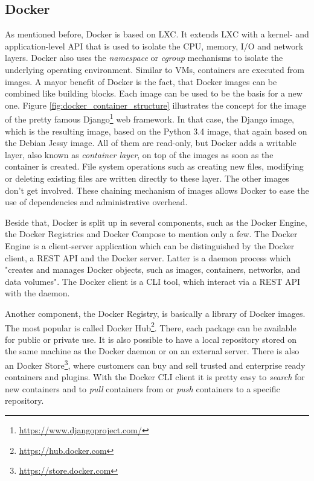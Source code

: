 \subsection{Docker}
As mentioned before, Docker is based on \ac{LXC}.
It extends \ac{LXC} with a kernel- and application-level API that is used to isolate the CPU, memory, I/O and network layers.\autocite[cf.][p. 82]{Bernstein:2014}
Docker also uses the \textit{namespace} or \textit{cgroup} mechanisms to isolate the underlying operating environment.\autocite[cf.][p. 82]{Bernstein:2014}
Similar to \acp{VM}, containers are executed from images.
A mayor benefit of Docker is the fact, that Docker images can be combined like building blocks.
Each image can be used to be the basis for a new one.
Figure \ref{fig:docker_container_structure} illustrates the concept for the image of the pretty famous Django\footnote{\url{https://www.djangoproject.com/}} web framework.
In that case, the Django image, which is the resulting image, based on the Python 3.4 image, that again based on the Debian Jessy image.
All of them are read-only, but Docker adds a writable layer, also known as \textit{container layer}, on top of the images as soon as the container is created.
File system operations such as creating new files, modifying or deleting existing files are written directly to these layer.\autocite[cf.]{dockerImages}
The other images don't get involved.
These chaining mechanism of images allows Docker to ease the use of dependencies and administrative overhead.

Beside that, Docker is split up in several components, such as the Docker Engine, the Docker Registries and Docker Compose to mention only a few.
The Docker Engine is a client-server application which can be distinguished by the Docker client, a \ac{REST} \ac{API} and the Docker server.
Latter is a daemon process which "creates and manages Docker objects, such as images, containers, networks, and data volumes"\autocite{dockerEngine}.
The Docker client is a \ac{CLI} tool, which interact via a \ac{REST} \ac{API} with the daemon.\autocite[cf.]{dockerEngine}

Another component, the Docker Registry, is basically a library of Docker images.
The most popular is called Docker Hub\footnote{\url{https://hub.docker.com}}.
There, each package can be available for public or private use.
It is also possible to have a local repository stored on the same machine as the Docker daemon or on an external server.\autocite[cf.]{dockerEngine}
There is also an Docker Store\footnote{\url{https://store.docker.com}}, where customers can buy and sell trusted and enterprise ready containers and plugins.
With the Docker \ac{CLI} client it is pretty easy to \textit{search} for new containers and to \textit{pull} containers from or \textit{push} containers to a specific repository.

